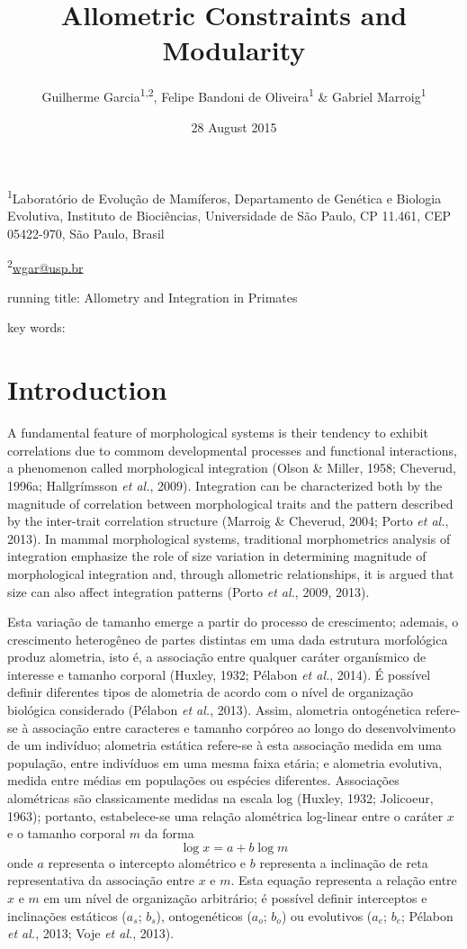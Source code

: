 \documentclass[12pt,]{article}
\title{Allometric Constraints and Modularity}
\author{Guilherme Garcia\textsuperscript{1,2}, Felipe Bandoni de
Oliveira\textsuperscript{1} \& Gabriel Marroig\textsuperscript{1}}
\date{28 August 2015}
\begin{document}
\maketitle


\linenumbers
\modulolinenumbers[2]

\onehalfspacing

\textsuperscript{1}Laboratório de Evolução de Mamíferos, Departamento de
Genética e Biologia Evolutiva, Instituto de Biociências, Universidade de
São Paulo, CP 11.461, CEP 05422-970, São Paulo, Brasil

\textsuperscript{2}\href{mailto:wgar@usp.br}{wgar@usp.br}

running title: Allometry and Integration in Primates

key words:

\section{Introduction}\label{introduction}

A fundamental feature of morphological systems is their tendency to
exhibit correlations due to commom developmental processes and
functional interactions, a phenomenon called morphological integration
(Olson \& Miller, 1958; Cheverud, 1996a; Hallgrímsson \emph{et al.},
2009). Integration can be characterized both by the magnitude of
correlation between morphological traits and the pattern described by
the inter-trait correlation structure (Marroig \& Cheverud, 2004; Porto
\emph{et al.}, 2013). In mammal morphological systems, traditional
morphometrics analysis of integration emphasize the role of size
variation in determining magnitude of morphological integration and,
through allometric relationships, it is argued that size can also affect
integration patterns (Porto \emph{et al.}, 2009, 2013).

Esta variação de tamanho emerge a partir do processo de crescimento;
ademais, o crescimento heterogêneo de partes distintas em uma dada
estrutura morfológica produz alometria, isto é, a associação entre
qualquer caráter organísmico de interesse e tamanho corporal (Huxley,
1932; Pélabon \emph{et al.}, 2014). É possível definir diferentes tipos
de alometria de acordo com o nível de organização biológica considerado
(Pélabon \emph{et al.}, 2013). Assim, alometria ontogénetica refere-se à
associação entre caracteres e tamanho corpóreo ao longo do
desenvolvimento de um indivíduo; alometria estática refere-se à esta
associação medida em uma população, entre indivíduos em uma mesma faixa
etária; e alometria evolutiva, medida entre médias em populações ou
espécies diferentes. Associações alométricas são classicamente medidas
na escala log (Huxley, 1932; Jolicoeur, 1963); portanto, estabelece-se
uma relação alométrica log-linear entre o caráter $x$ e o tamanho
corporal $m$ da forma \[
\log x = a + b \log m
\] onde $a$ representa o intercepto alométrico e $b$ representa a
inclinação de reta representativa da associação entre $x$ e $m$. Esta
equação representa a relação entre $x$ e $m$ em um nível de organização
arbitrário; é possível definir interceptos e inclinações estáticos
($a_s$; $b_s$), ontogenéticos ($a_o$; $b_o$) ou evolutivos ($a_e$;
$b_e$; Pélabon \emph{et al.}, 2013; Voje \emph{et al.}, 2013).
\end{document}
